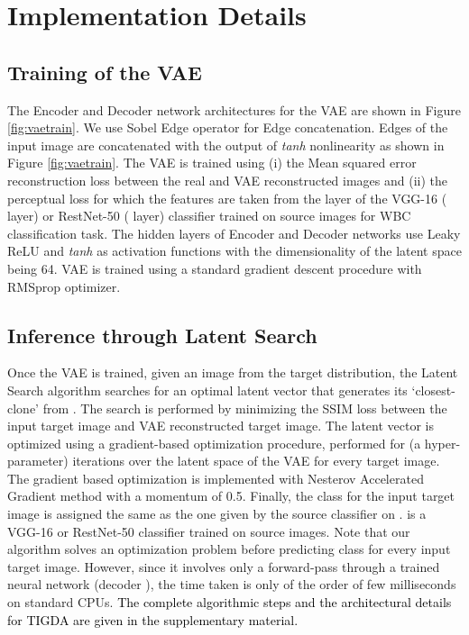 \documentclass[journal,twoside,web]{IEEEtran}
\newcommand{\bb}{\textcolor{black}}
\begin{document}
\section {Implementation Details}
\subsection{Training of the VAE}
The Encoder  and Decoder  network architectures for the VAE are shown in Figure \ref{fig:vaetrain}.
We use Sobel Edge operator for Edge concatenation. Edges of the input image are concatenated with the output of \textit{tanh} nonlinearity as shown in Figure \ref{fig:vaetrain}. The VAE is trained using (i) the Mean squared error reconstruction loss  between the real and VAE reconstructed images and (ii) the perceptual loss  for which the features are taken from the  layer of the VGG-16 ( layer) or RestNet-50 ( layer) classifier trained on source images for WBC classification task.  The hidden layers of Encoder and Decoder networks use Leaky ReLU and \textit{tanh} as activation functions with the dimensionality of the latent space being 64. VAE is trained using a standard gradient descent procedure with RMSprop optimizer.

\subsection{Inference through Latent Search}
Once the VAE is trained, given an image  from the target distribution,
the Latent Search algorithm searches for an optimal latent vector  that generates its `closest-clone'  from . The search is performed by minimizing the SSIM loss  between the input target image  and VAE reconstructed target image. The latent vector is optimized using a gradient-based optimization procedure, performed for  (a hyper-parameter) iterations over the latent space of the VAE for every target image. The gradient based optimization is implemented with Nesterov Accelerated Gradient method with a momentum of 0.5. Finally, the class for the input target image is assigned the same as the one given by the source classifier  on .  is a VGG-16 or RestNet-50 classifier  trained  on  source images.  Note that our algorithm solves an optimization problem before predicting class for every input target image. However, since it involves only a forward-pass through a trained neural network (decoder ), the time taken is only of the order of few milliseconds on standard CPUs. \bb{The complete algorithmic steps and the architectural details for TIGDA are given in the supplementary material.}
\end{document}
